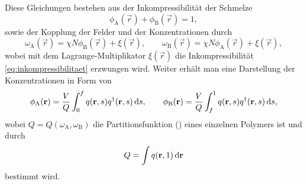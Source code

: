 Diese Gleichungen bestehen aus der Inkompressibilität der Schmelze
\begin{equation}
\label{eq:inkompressibilitaet}
    \phi_{\mathrm{A}}(\vec{r}) + \phi_{\mathrm{B}}(\vec{r}) = 1,
\end{equation}%
sowie der Kopplung der Felder und der Konzentrationen durch
\begin{equation}
\label{eq:felder}
        \omega_{\mathrm{A}}(\vec{r}) = \chi N \phi_{\mathrm{B}}(\vec{r}) + \xi(\vec{r}), \qquad
        \omega_{\mathrm{B}}(\vec{r}) = \chi N \phi_{\mathrm{A}}(\vec{r}) + \xi(\vec{r}),
\end{equation}%
wobei mit dem Lagrange-Multiplikator $\xi(\vec{r})$ die Inkompressibilität \cref{eq:inkompressibilitaet} erzwungen wird.
Weiter erhält man eine Darstellung der Konzentrationen in Form von
\begin{equation}
\label{eq:konzentrationen}
        \phi_{\mathrm{A}}(\mathbf{r}) = \frac{V}{Q} \int_{0}^{f} q(\mathbf{r}, s) q^{\dagger}(\mathbf{r}, s) \mathop{}\!\mathrm{d} s, \qquad
        \phi_{\mathrm{B}}(\mathbf{r}) = \frac{V}{Q} \int_{f}^{1} q(\mathbf{r}, s) q^{\dagger}(\mathbf{r}, s) \mathop{}\!\mathrm{d} s,
\end{equation}%
wobei $Q = Q(\omega_{\mathrm{A}}, \omega_{\mathrm{B}})$ die Partitionsfunktion () eines einzelnen Polymers ist und durch
\begin{equation}
\label{eq:partitionsfunktion}
    Q = \int q(\mathbf{r}, 1) \mathop{}\!\mathrm{d} \mathbf{r}
\end{equation}%
bestimmt wird.

